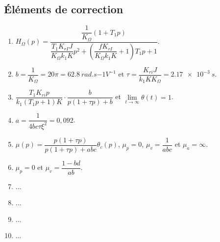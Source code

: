\documentclass[10pt,fleqn]{article} %
\begin{document}
\begin{multicols}{2}
\subsection*{Éléments de correction}
\begin{enumerate}
\item $H_{\Omega}(p)=\dfrac{\dfrac{1}{K_{\Omega}}\left( 1 + T_{1}p \right)}{\dfrac{T_{1} K_{rI}J}{K_{\Omega}k_{1}K}p^2+\left(\dfrac{f K_{rI}}{K_{\Omega}k_{1}K}+1\right)T_{1}p + 1 }$.
\item  $b=\dfrac{1}{K_{\Omega}} = 20 \pi = \SI{62,8}{rad.s{-1}V^{-1}}$ et $\tau=\dfrac{K_{ri}J}{k_1KK_{\Omega}}=\SI{2,17e-3}{s}$.
\item $\dfrac{T_{1}K_{ri}p}{ k_{1}\left( T_{1}p + 1 \right)K}\cdot \dfrac{b}{p\left(1+\tau p \right)+b}$ et $\lim\limits_{t\to\infty} \theta(t) = 1$.
\item  ${a}=\dfrac{1}{4bc\tau\xi^2}=0,092$.
\item $\mu(p)=\dfrac{p\left( 1+\tau p\right)}{p\left( 1+\tau p\right)+abc}\theta_c(p)$, $\mu_p = 0$, $\mu_v = \dfrac{1}{abc}$ et  $\mu_a = \infty$.
\item $\mu_p=0$ et $\mu_v= \dfrac{1 -bd}{ab}$.
\item ...
\item ...
\item ...
\item ...
\end{enumerate}
\end{multicols}

%
\end{document}
